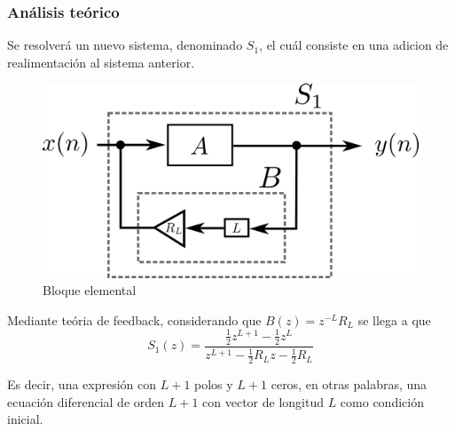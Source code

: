 \documentclass[assd_tp2_main.tex]{subfiles}
\begin{document}
\subsubsection{Análisis teórico}
Se resolverá un nuevo sistema, denominado $S_1$, el cuál consiste en una adicion de realimentación al sistema anterior.
\begin{figure}[H]	
	\centering
	\includegraphics[scale=1]{graficos/bloque2ej5.png}
	\caption{Bloque elemental}
	\label{fig:bloqueElemental}
\end{figure}

Mediante teória de feedback, considerando que $B(z)=z^{-L}R_L$ se llega a que
\begin{equation}
S_1(z)=\frac{ \frac{1}{2} z^{L+1} - \frac{1}{2}z^L}{ z^{L+1} - \frac{1}{2}R_L z-\frac{1}{2}R_L } 
\end{equation}

Es decir, una expresión con $L+1$ polos y $L+1$ ceros, en otras palabras, una ecuación diferencial de orden $L+1$ con vector de longitud $L$ como condición inicial.
 
\end{document}

